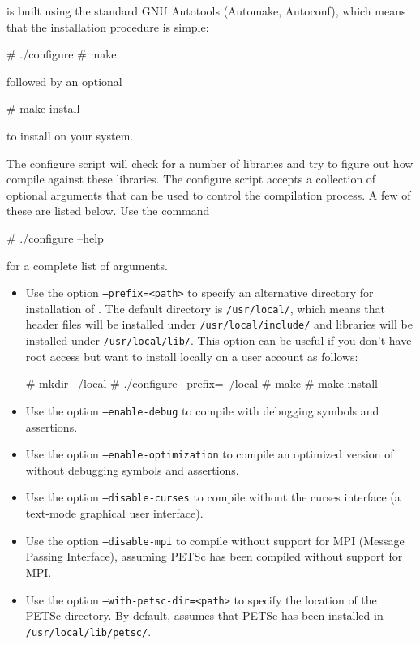 \dolfin{} is built using the standard GNU Autotools (Automake,
Autoconf), which means that the installation procedure is simple:
\begin{code}
  # ./configure
  # make
\end{code}
followed by an optional
\begin{code}
  # make install
\end{code}
to install \dolfin{} on your system.

The configure script will check for a number of libraries and try
to figure out how compile \dolfin{} against these libraries. The
configure script accepts a collection of optional arguments that can be
used to control the compilation process. A few of these are listed
below. Use the command
\begin{code}
  # ./configure --help
\end{code}
for a complete list of arguments.

\begin{itemize}
\item
  Use the option \texttt{--prefix=<path>} to specify an alternative
  directory for installation of \dolfin{}. The default directory is
  \texttt{/usr/local/}, which means that header files will be
  installed under \texttt{/usr/local/include/} and libraries will be
  installed under \texttt{/usr/local/lib/}. This option can be useful
  if you don't have root access but want to install \dolfin{} locally
  on a user account as follows:
  \begin{code}
    # mkdir ~/local
    # ./configure --prefix=~/local
    # make
    # make install
  \end{code}
\item
  Use the option \texttt{--enable-debug} to compile \dolfin{} with
  debugging symbols and assertions.
\item
  Use the option \texttt{--enable-optimization} to compile an
  optimized version of \dolfin{} without debugging symbols
  and assertions.
\item
  Use the option \texttt{--disable-curses} to compile \dolfin{}
  without the curses interface (a text-mode graphical user interface).
\item
  Use the option \texttt{--disable-mpi} to compile \dolfin{} without
  support for MPI (Message Passing Interface), assuming PETSc has been
  compiled without support for MPI.
\item
  Use the option \texttt{--with-petsc-dir=<path>} to specify the
  location of the PETSc directory. By default, \dolfin{} assumes that
  PETSc has been installed in \texttt{/usr/local/lib/petsc/}.
\end{itemize}

